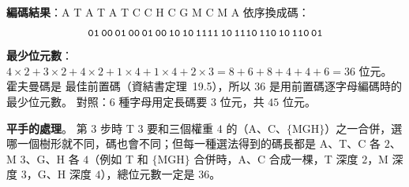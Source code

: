 \begin{pastsoln}
\textbf{編碼結果}：A T A T A T C C H C G M C M A 依序換成碼：
\[
\texttt{01\,00\,01\,00\,01\,00\,10\,10\,1111\,10\,1110\,110\,10\,110\,01}
\]
\textbf{最少位元數}：$4 \times 2 + 3 \times 2 + 4 \times 2 + 1 \times 4 + 1 \times 4 + 2 \times 3 = 8 + 6 + 8 + 4 + 4 + 6 = 36$ 位元。 霍夫曼碼是
最佳前置碼（資結書定理~19.5），所以 $36$ 是用前置碼逐字母編碼時的最少位元數。 對照：$6$ 種字母用定長碼要 $3$ 位元，共 $45$ 位元。

\textbf{平手的處理}。 第 3 步時 T 3 要和三個權重 $4$ 的（A、C、$\{$MGH$\}$）之一合併，選哪一個樹形就不同，碼也會不同；但每一種選法得到的碼長都是
A、T、C 各 $2$、M $3$、G、H 各 $4$（例如 T 和 $\{$MGH$\}$ 合併時，A、C 合成一棵，T 深度 $2$，M 深度 $3$，G、H 深度 $4$），總位元數一定是 $36$。
\end{pastsoln}
